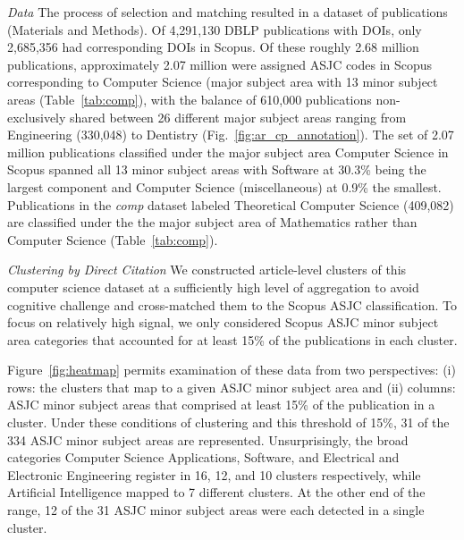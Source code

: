 \emph{Data} The process of selection and matching resulted in a dataset of  publications (Materials and Methods). Of 4,291,130 DBLP publications with DOIs, only  2,685,356 had corresponding DOIs in Scopus. Of these roughly 2.68 million publications, approximately 2.07 million were assigned ASJC codes in Scopus corresponding to Computer Science (major subject area with 13 minor subject areas (Table~\ref{tab:comp}), with the balance of 610,000 publications non-exclusively shared between 26 different major subject areas ranging from Engineering (330,048) to Dentistry (Fig.~\ref{fig:ar_cp_annotation}). The set of 2.07 million publications classified under the major subject area Computer Science in Scopus spanned all 13 minor subject areas with Software at 30.3\%  being the largest component and Computer Science (miscellaneous) at 0.9\% the smallest. Publications in the \emph{comp} dataset labeled Theoretical Computer Science (409,082) are classified under the the major subject area of Mathematics rather than Computer Science (Table~\ref{tab:comp}). 

\emph{Clustering by Direct Citation} We constructed article-level clusters of this computer science dataset at a sufficiently high level of aggregation to avoid cognitive challenge and cross-matched them to the Scopus ASJC classification. To focus on relatively high signal, we only considered Scopus ASJC minor subject area categories that accounted for at least 15\% of the publications in each cluster. 

Figure~\ref{fig:heatmap} permits examination of these data from two perspectives: (i) rows: the clusters that map to a given ASJC minor subject area and (ii) columns: ASJC minor subject areas that comprised at least 15\% of the publication in a cluster. Under these conditions of clustering and this threshold of 15\%, 31 of the 334 ASJC minor subject areas are represented. Unsurprisingly, the broad categories Computer Science Applications, Software, and Electrical and Electronic Engineering register in 16, 12, and 10 clusters respectively, while Artificial Intelligence mapped to 7 different clusters. At the other end of the range, 12 of the 31 ASJC minor subject areas were each detected in a single cluster. 

